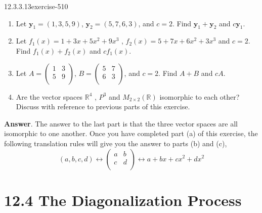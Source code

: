 \documentclass[twoside,10pt,]{book}
\numberwithin{equation}{section}
\renewcommand{\vec}[1]{\mathbf{#1}}
\begin{document}
\begin{divisionsolution}{12.3.3.13}{}{exercise-510}%
\hypertarget{p-4561}{}%
\leavevmode%
\begin{enumerate}[label=(\alph*)]
\item\hypertarget{li-2094}{}\hypertarget{p-4562}{}%
Let \(\vec{y}_1= (1,3, 5, 9)\),  \(\vec{y}_2= (5,7, 6, 3)\), and \(c = 2\).  Find \(\vec{y}_1+\vec{y}_2\) and \(c \vec{y}_1\).%
\item\hypertarget{li-2095}{}\hypertarget{p-4563}{}%
Let  \(f_1(x) = 1 + 3x + 5x^2 + 9x^3\) , \(f_2(x)=5 + 7x+6x^2+3x^3\) and \(c = 2\). Find \(f_1(x)+f_2(x)\) and \(c f_1(x)\).%
\item\hypertarget{li-2096}{}\hypertarget{p-4564}{}%
Let \(A =\left(
\begin{array}{cc}
1 & 3 \\
5 & 9 \\
\end{array}
\right)\), \(B=\left(
\begin{array}{cc}
5 & 7 \\
6 & 3 \\
\end{array}
\right)\), and \(c=2\). Find \(A + B\) and \(c A\).%
\item\hypertarget{li-2097}{}\hypertarget{p-4565}{}%
Are the vector spaces \(\mathbb{R}^4\) , \(P^3\) and \(M_{2\times 2}(\mathbb{R})\) isomorphic to each other? Discuss with reference to previous parts of this exercise.%
\end{enumerate}
%
\par\smallskip%
\noindent\textbf{Answer}.\quad%
\hypertarget{p-4566}{}%
The answer to the last part is that the three vector spaces are all isomorphic to one another.  Once you have completed part (a) of this exercise, the following translation rules will give you the answer to parts (b) and (c),%
\begin{equation*}
(a,b,c,d) \leftrightarrow  \left(
\begin{array}{cc}
a & b \\
c & d \\
\end{array}
\right)\leftrightarrow  a + b x+c x^2+ d x^2
\end{equation*}
%
\end{divisionsolution}%
\section*{12.4 The Diagonalization Process}
\end{document}
